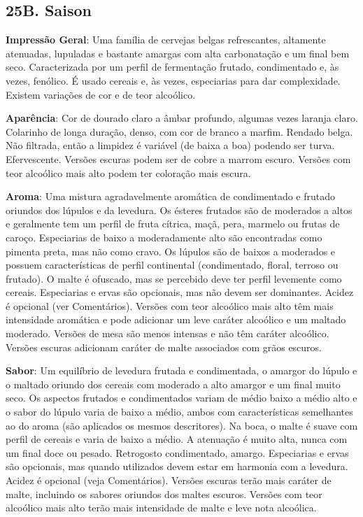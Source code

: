 \subsection*{25B. Saison}
\textbf{Impressão Geral}: Uma família de cervejas belgas refrescantes, altamente atenuadas, lupuladas e bastante amargas com alta carbonatação e um final bem seco. Caracterizada por um perfil de fermentação frutado, condimentado e, às vezes, fenólico. É usado cereais e, às vezes, especiarias para dar complexidade. Existem variações de cor e de teor alcoólico.

\textbf{Aparência}: Cor de dourado claro a âmbar profundo, algumas vezes laranja claro. Colarinho de longa duração, denso, com cor de branco a marfim. Rendado belga. Não filtrada, então a limpidez é variável (de baixa a boa) podendo ser turva. Efervescente. Versões escuras podem ser de cobre a marrom escuro. Versões com teor alcoólico mais alto podem ter coloração mais escura.

\textbf{Aroma}: Uma mistura agradavelmente aromática de condimentado e frutado oriundos dos lúpulos e da levedura. Os ésteres frutados são de moderados a altos e geralmente tem um perfil de fruta cítrica, maçã, pera, marmelo ou frutas de caroço. Especiarias de baixo a moderadamente alto são encontradas como pimenta preta, mas não como cravo. Os lúpulos são de baixos a moderados e possuem características de perfil continental (condimentado, floral, terroso ou frutado). O malte é ofuscado, mas se percebido deve ter perfil levemente como cereais. Especiarias e ervas são opcionais, mas não devem ser dominantes. Acidez é opcional (ver Comentários). Versões com teor alcoólico mais alto têm mais intensidade aromática e pode adicionar um leve caráter alcoólico e um maltado moderado. Versões de mesa são menos intensas e não têm caráter alcoólico. Versões escuras adicionam caráter de malte associados com grãos escuros.

\textbf{Sabor}: Um equilíbrio de levedura frutada e condimentada, o amargor do lúpulo e o maltado oriundo dos cereais com moderado a alto amargor e um final muito seco. Os aspectos frutados e condimentados variam de médio baixo a médio alto e o sabor do lúpulo varia de baixo a médio, ambos com características semelhantes ao do aroma (são aplicados os mesmos descritores). Na boca, o malte é suave com perfil de cereais e varia de baixo a médio. A atenuação é muito alta, nunca com um final doce ou pesado. Retrogosto condimentado, amargo. Especiarias e ervas são opcionais, mas quando utilizados devem estar em harmonia com a levedura. Acidez é opcional (veja Comentários). Versões escuras terão mais caráter de malte, incluindo os sabores oriundos dos maltes escuros. Versões com teor alcoólico mais alto terão mais intensidade de malte e leve nota alcoólica.

